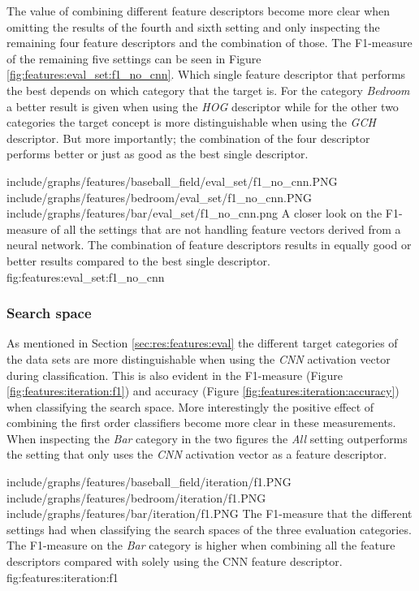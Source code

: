 The value of combining different feature descriptors become more clear when omitting the results of the fourth and sixth setting and only inspecting the remaining four feature descriptors and the combination of those. The F1-measure of the remaining five settings can be seen in Figure \ref{fig:features:eval_set:f1_no_cnn}. Which single feature descriptor that performs the best depends on which category that the target is. For the category \emph{Bedroom} a better result is given when using the \emph{HOG} descriptor while for the other two categories the target concept is more distinguishable when using the \emph{GCH} descriptor. But more importantly; the combination of the four descriptor performs better or just as good as the best single descriptor. 


\tripfigure
{include/graphs/features/baseball_field/eval_set/f1_no_cnn.PNG}
{include/graphs/features/bedroom/eval_set/f1_no_cnn.PNG}
{include/graphs/features/bar/eval_set/f1_no_cnn.png}
{A closer look on the F1-measure of all the settings that are not handling feature vectors derived from a neural network. The combination of feature descriptors results in equally good or better results compared to the best single descriptor.}
{fig:features:eval_set:f1_no_cnn}

\subsubsection{Search space}
\label{sec:res:features:iter}

As mentioned in Section \ref{sec:res:features:eval} the different target categories of the data sets are more distinguishable when using the \emph{CNN} activation vector during classification. This is also evident in the F1-measure (Figure \ref{fig:features:iteration:f1}) and accuracy (Figure \ref{fig:features:iteration:accuracy}) when classifying the search space. More interestingly the positive effect of combining the first order classifiers become more clear in these measurements. When inspecting the \emph{Bar} category in the two figures the \emph{All} setting outperforms the setting that only uses the \emph{CNN} activation vector as a feature descriptor.

\tripfigurenear
{include/graphs/features/baseball_field/iteration/f1.PNG}
{include/graphs/features/bedroom/iteration/f1.PNG}
{include/graphs/features/bar/iteration/f1.PNG}
{The F1-measure that the different settings had when classifying the search spaces of the three evaluation categories. The F1-measure on the \emph{Bar} category is higher when combining all the feature descriptors compared with solely using the CNN feature descriptor.}
{fig:features:iteration:f1}

